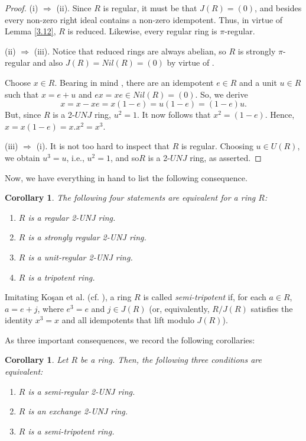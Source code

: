 \documentclass[12pt]{amsart}
\newtheorem{corollary}[theorem]{Corollary}
\theoremstyle{definition}
\begin{document}
\begin{proof}
(i) \(\Rightarrow\) (ii). Since \(R\) is regular, it must be that \(J(R) = (0)\), and besides every non-zero right ideal contains a non-zero idempotent. Thus, in virtue of Lemma \ref{3.12}, \(R\) is reduced. Likewise, every regular ring is \(\pi\)-regular.

(ii) \(\Rightarrow\) (iii). Notice that reduced rings are always abelian, so \(R\) is strongly \(\pi\)-regular and also $J(R)=Nil(R)=(0)$ by virtue of \cite[Lemma 5]{4}.

Choose \(x \in R\). Bearing in mind \cite [Proposition 2.5]{5}, there are an idempotent \(e \in R\) and a unit \(u \in R\) such that \(x = e + u\) and \(ex = xe \in Nil(R) = (0)\). So, we derive \[x = x - xe = x(1-e) = u(1-e) = (1-e)u.\] But, since \(R\) is a 2-$UNJ$ ring, \(u^2 = 1\). It now follows that \(x^2 = (1-e)\). Hence, \(x = x(1-e) = x.x^2 = x^3\).

(iii) \(\Rightarrow\) (i). It is not too hard to inspect that \(R\) is regular. Choosing \(u \in U(R)\), we obtain \(u^3 = u\), i.e., \(u^2 = 1\), and so\(R\) is a 2-$UNJ$ ring, as asserted.
\end{proof}

Now, we have everything in hand to list the following consequence.

\begin{corollary}\label{3.14}
The following four statements are equivalent for a ring \(R\):
\begin{enumerate}
\item
\(R\) is a regular 2-UNJ ring.
\item
 \(R\) is a strongly regular 2-UNJ ring.
\item
\(R\) is a unit-regular 2-UNJ ring.
\item
\(R\) is a tripotent ring.
\end{enumerate}
\end{corollary}

Imitating Ko\c{s}an et al. (cf. \cite {17}), a ring $R$ is called {\it semi-tripotent} if, for each $a\in R$, $a=e+j$, where $e^3=e$ and $j\in J(R)$ (or, equivalently, $R/J(R)$ satisfies the identity $x^3=x$ and all idempotents that lift modulo $J(R)$).

\medskip

As three important consequences, we record the following corollaries:

\begin{corollary}\label{3.16}
Let \(R\) be a ring. Then, the following three conditions are equivalent:
\begin{enumerate}
\item
\(R\) is a semi-regular 2-UNJ ring.
\item
\(R\) is an exchange 2-UNJ ring.
\item
\(R\) is a semi-tripotent ring.
\end{enumerate}
\end{corollary}
\end{document}
